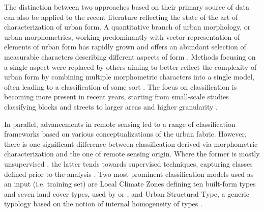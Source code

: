The distinction between two approaches based on their primary source of data can also be applied to the recent literature reflecting the state of the art of characterization of urban form. A quantitative branch of urban morphology, or urban morphometrics, working predominantly with vector representation of elements of urban form has rapidly grown and offers an abundant selection of measurable characters describing different aspects of form \citep{fleischmann2020measuring}. Methods focusing on a single aspect \citep{porta2006} were replaced by others aiming to better reflect the complexity of urban form by combining multiple morphometric characters into a single model, often leading to a classification of some sort \citep{song2007}. The focus on classification is becoming more present in recent years, starting from small-scale studies classifying blocks and streets \citep{gil2012} to larger areas and higher granularity \citep{schirmer2015, araldi2019, bobkova2019, dibble2019origin, jochem2020}.

In parallel, advancements in remote sensing led to a range of classification frameworks based on various conceptualizations of the urban fabric. However, there is one significant difference between classification derived via morphometric characterization and the one of remote sensing origin. Where the former is mostly unsupervised \citep{araldi2019, schirmer2015}, the latter tends towards supervised techniques, capturing classes defined prior to the analysis \citep{ pauleit2000assessing}. Two most prominent classification models used as an input (i.e. training set) are Local Climate Zones \citep{stewart2012} defining ten built-form types and seven land cover types, used by \cite{koc2017mapping} or \cite{taubenbock2020}, and Urban Structural Type, a generic typology based on the notion of internal homogeneity of types \citep{lehner2019}. 





